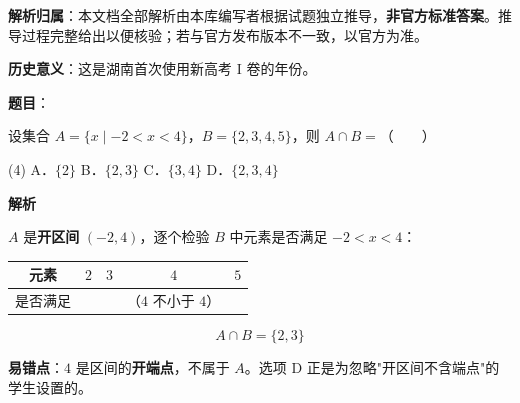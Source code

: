 

\begin{gknotice}
\textbf{解析归属}：本文档全部解析由本库编写者根据试题独立推导，\textbf{非官方标准答案}。推导过程完整给出以便核验；若与官方发布版本不一致，以官方为准。

\textbf{历史意义}：这是湖南首次使用新高考 I 卷的年份。
\end{gknotice}

\par\medskip


\begin{answer}

\textbf{题目}：

设集合 $A=\{x\mid-2<x<4\}$，$B=\{2,3,4,5\}$，则 $A\cap B=$\mbox{（　　）}

\begin{gkopts}(4)
\task A．$\{2\}$
\task B．$\{2,3\}$
\task C．$\{3,4\}$
\task D．$\{2,3,4\}$
\end{gkopts}

\textbf{解析}

$A$ 是\textbf{开区间} $(-2,4)$，逐个检验 $B$ 中元素是否满足 $-2<x<4$：

\begin{center}
\begin{tabular}{ccccc}
\toprule
元素 & $2$ & $3$ & $4$ & $5$ \\
\midrule
是否满足 &  &  & （$4$ 不小于 $4$） &  \\
\bottomrule
\end{tabular}
\end{center}

\nopagebreak[4]
\[A\cap B=\{2,3\}\]

\begin{gktip}
\textbf{易错点}：$4$ 是区间的\textbf{开端点}，不属于 $A$。选项 D 正是为忽略"开区间不含端点"的学生设置的。
\end{gktip}


\par\medskip

\end{answer}
